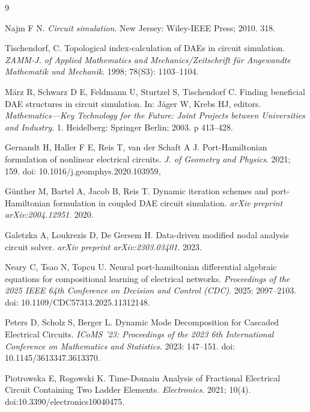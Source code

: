 \documentclass[a4paper, nobib,justified]{tufte-handout}
\begin{document}
	\begin{thebibliography}{9}
	\raggedright
	Najm F N. {\itshape Circuit simulation}. New Jersey: Wiley-IEEE Press; 2010. 318.
	
	\raggedright
	Tischendorf, C. Topological index‐calculation of DAEs in circuit simulation. {\itshape ZAMM‐J. of Applied Mathematics and Mechanics/Zeitschrift für Angewandte Mathematik und Mechanik}. 1998; 78(S3): 1103--1104.
	
	\raggedright
	M{\"a}rz R,  Schwarz  D E, Feldmann U, Sturtzel S, Tischendorf C. Finding beneficial DAE structures in circuit simulation. In: J{\"a}ger W, Krebs HJ, editors.  {\itshape Mathematics—Key Technology for the Future: Joint Projects between Universities and Industry}. 1. Heidelberg: Springer Berlin; 2003. p 413--428.
	
	
	\raggedright
	Gernandt H, Haller F E, Reis T, van der Schaft A J.	Port-Hamiltonian formulation of nonlinear electrical circuits. 
	{\itshape J. of Geometry and Physics}. 2021; 159. doi: {10.1016/j.geomphys.2020.103959},
	
	\raggedright
	G{\"u}nther M, Bartel A, Jacob B, Reis T. Dynamic iteration schemes and port-Hamiltonian formulation in coupled DAE circuit simulation. {\itshape arXiv preprint arXiv:2004.12951}. 2020.
	
	\raggedright
	Galetzka A, Loukrezis D, De Gersem H. Data-driven modified nodal analysis circuit solver. {\itshape arXiv preprint arXiv:2303.03401}. 2023.
	
	\raggedright
	Neary C, Tsao N, Topcu U. Neural port-hamiltonian differential algebraic equations for compositional learning of electrical networks. {\itshape Proceedings of the 2025 IEEE 64th Conference on Decision and Control (CDC)}. 2025: 2097--2103. doi: {10.1109/CDC57313.2025.11312148}.
	
	\raggedright
	Peters D, Scholz S, Berger L. Dynamic Mode Decomposition for Cascaded Electrical Circuits. {\itshape ICoMS '23: Proceedings of the 2023 6th International Conference on Mathematics and Statistics}. 2023: 147--151. doi: {10.1145/3613347.3613370}.		
	
	\raggedright
	Piotrowska E, Rogowski K.  Time-Domain Analysis of Fractional Electrical Circuit Containing Two Ladder Elements. {\itshape Electronics}. 2021; 10(4). doi:{10.3390/electronics10040475}.
	

\end{thebibliography}
\end{document}
